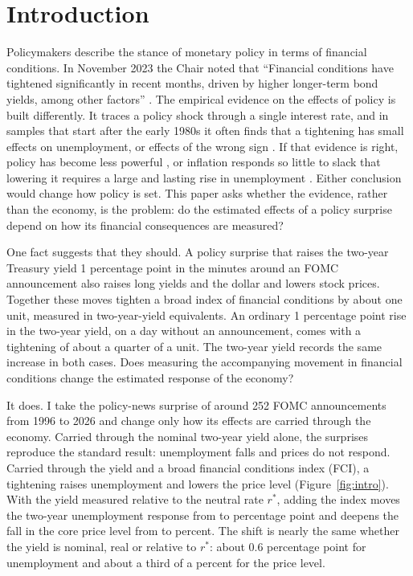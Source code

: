 \documentclass[11pt]{article}
\newcommand{\rs}{r^{*}}
\begin{document}
\section{Introduction}
\label{sec:intro}
Policymakers describe the stance of monetary policy in terms of financial conditions. In November 2023 the Chair noted that ``Financial conditions have tightened significantly in recent months, driven by higher longer-term bond yields, among other factors'' \citep{powell2023}. The empirical evidence on the effects of policy is built differently. It traces a policy shock through a single interest rate, and in samples that start after the early 1980s it often finds that a tightening has small effects on unemployment, or effects of the wrong sign \citep{ramey2016}. If that evidence is right, policy has become less powerful \citep{boivin2006,boivin2010}, or inflation responds so little to slack that lowering it requires a large and lasting rise in unemployment \citep{hazell2022,delnegro2020}. Either conclusion would change how policy is set. This paper asks whether the evidence, rather than the economy, is the problem: do the estimated effects of a policy surprise depend on how its financial consequences are measured?

One fact suggests that they should. A policy surprise that raises the two-year Treasury yield 1 percentage point in the minutes around an FOMC announcement also raises long yields and the dollar and lowers stock prices. Together these moves tighten a broad index of financial conditions by about one unit, measured in two-year-yield equivalents. An ordinary 1 percentage point rise in the two-year yield, on a day without an announcement, comes with a tightening of about a quarter of a unit. The two-year yield records the same increase in both cases. Does measuring the accompanying movement in financial conditions change the estimated response of the economy?

It does. I take the policy-news surprise of \citet{nakamura2018} around 252 FOMC announcements from 1996 to 2026 and change only how its effects are carried through the economy. Carried through the nominal two-year yield alone, the surprises reproduce the standard result: unemployment falls and prices do not respond. Carried through the yield and a broad financial conditions index (FCI), a tightening raises unemployment and lowers the price level (Figure~\ref{fig:intro}). With the yield measured relative to the neutral rate $\rs$, adding the index moves the two-year unemployment response from  to  percentage point and deepens the fall in the core price level from  to  percent. The shift is nearly the same whether the yield is nominal, real or relative to $\rs$: about 0.6 percentage point for unemployment and about a third of a percent for the price level.
\end{document}
